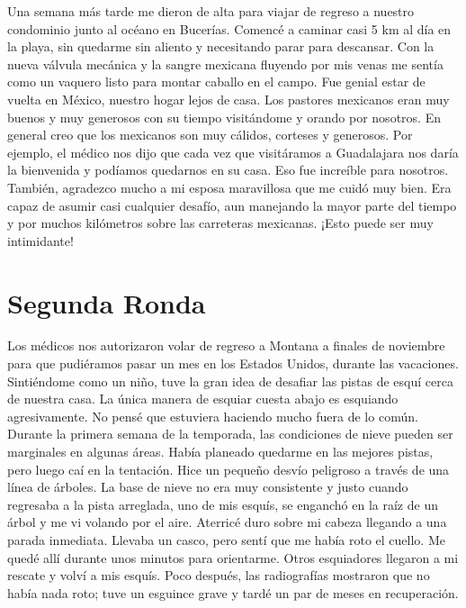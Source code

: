 \documentclass[twoside, 12pt]{book}
\begin{document}
Una semana más tarde me dieron de alta para viajar de regreso a nuestro condominio junto al océano en Bucerías. Comencé a caminar casi 5 km al día en la playa, sin quedarme sin aliento y necesitando parar para descansar. Con la nueva válvula mecánica y la sangre mexicana fluyendo por mis venas me sentía como un vaquero listo para montar caballo en el campo.  Fue genial estar de vuelta en México, nuestro hogar lejos de casa.  Los pastores mexicanos eran muy buenos y muy generosos con su tiempo visitándome y orando por nosotros. En general creo que los mexicanos son muy cálidos, corteses y generosos. Por ejemplo, el médico nos dijo que cada vez que visitáramos a Guadalajara nos daría la bienvenida y podíamos quedarnos en su casa. Eso fue increíble para nosotros. También, agradezco mucho a mi esposa maravillosa que me cuidó muy bien. Era capaz de asumir casi cualquier desafío, aun manejando la mayor parte del tiempo y por muchos kilómetros sobre las carreteras mexicanas. ¡Esto puede ser muy intimidante!\\


\section{Segunda Ronda}

Los médicos nos autorizaron volar de regreso a Montana a finales de noviembre para que pudiéramos pasar un mes en los Estados Unidos, durante las vacaciones.  Sintiéndome como un niño, tuve la gran idea de desafiar las pistas de esquí cerca de nuestra casa. La única manera de esquiar cuesta abajo es esquiando agresivamente.  No pensé que estuviera haciendo mucho fuera de lo común. Durante la primera semana de la temporada, las condiciones de nieve pueden ser marginales en algunas áreas. Había planeado quedarme en las mejores pistas, pero luego caí en la tentación. Hice un pequeño desvío peligroso a través de una línea de árboles. La base de nieve no era muy consistente y justo cuando regresaba a la pista arreglada, uno de mis  esquís, se enganchó en la raíz de un árbol y me vi volando por el aire. Aterricé duro sobre mi cabeza llegando a una parada inmediata. Llevaba un casco, pero sentí que me había roto el cuello. Me quedé allí durante unos minutos para orientarme. Otros esquiadores llegaron a mi rescate y volví a mis esquís. Poco después, las radiografías mostraron que no había nada roto; tuve un esguince grave y tardé un par de meses en recuperación.\\
\end{document}

